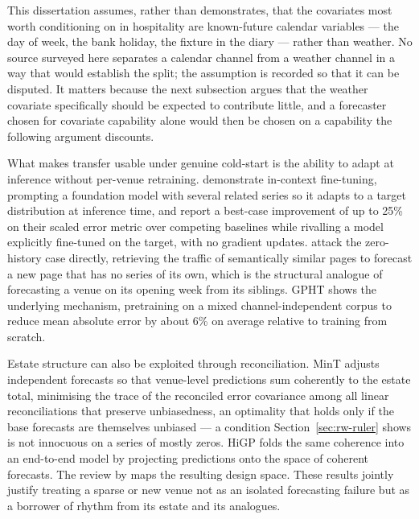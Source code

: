 This dissertation assumes, rather than demonstrates, that the covariates most
worth conditioning on in hospitality are known-future calendar variables ---
the day of week, the bank holiday, the fixture in the diary --- rather than
weather. No source surveyed here separates a calendar channel from a weather
channel in a way that would establish the split; the assumption is recorded so
that it can be disputed. It matters because the next subsection argues that the
weather covariate specifically should be expected to contribute little, and a
forecaster chosen for covariate capability alone would then be chosen on a
capability the following argument discounts.

What makes transfer usable under genuine cold-start is the ability to adapt at
inference without per-venue retraining. \citet{das_-context_2025} demonstrate
in-context fine-tuning, prompting a foundation model with several related
series so it adapts to a target distribution at inference time, and report a
best-case improvement of up to 25\% on their scaled error metric over competing
baselines while rivalling a model explicitly fine-tuned on the target, with no
gradient updates. \citet{zhou_context-driven_2025} attack the zero-history case
directly, retrieving the traffic of semantically similar pages to forecast a
new page that has no series of its own, which is the structural analogue of
forecasting a venue on its opening week from its siblings. GPHT
\citep{liu_generative_2024} shows the underlying mechanism, pretraining on a
mixed channel-independent corpus to reduce mean absolute error by about 6\% on
average relative to training from scratch.

Estate structure can also be exploited through reconciliation. MinT
\citep{wickramasuriya_optimal_2019} adjusts independent forecasts so that
venue-level predictions sum coherently to the estate total, minimising the
trace of the reconciled error covariance among all linear reconciliations that
preserve unbiasedness, an optimality that holds only if the base forecasts are
themselves unbiased --- a condition Section~\ref{sec:rw-ruler} shows is not
innocuous on a series of mostly zeros. HiGP \citep{cini_graph-based_2024} folds
the same coherence into an end-to-end model by projecting predictions onto the
space of coherent forecasts. The review by
\citet{athanasopoulos_forecast_2024} maps the resulting design space. These
results jointly justify treating a sparse or new venue not as an isolated
forecasting failure but as a borrower of rhythm from its estate and its
analogues.

